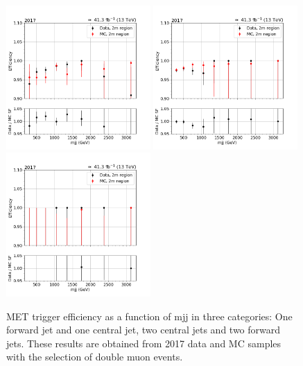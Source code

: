 \begin{figure}[htp]
    \begin{center}
        \includegraphics[width=0.49\textwidth]{fig/efficiency/trigger/met/mjj/data_mc_comparison_2m_2017_one_jet_forward_one_jet_central.png}
        \includegraphics[width=0.49\textwidth]{fig/efficiency/trigger/met/mjj/data_mc_comparison_2m_2017_two_central_jets.png} \\
        \includegraphics[width=0.49\textwidth]{fig/efficiency/trigger/met/mjj/data_mc_comparison_2m_2017_two_forward_jets.png}
    \end{center}
    \caption{MET trigger efficiency as a function of mjj in three categories: One forward jet and one central jet, two central jets and
            two forward jets. These results are obtained from 2017 data and MC samples with the selection of double muon events.} 
    \label{fig:eff_mjj_2017_2m}      
\end{figure}

